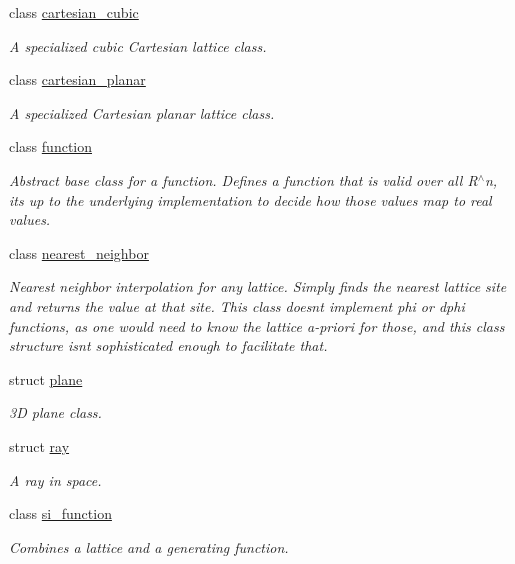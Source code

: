 \begin{DoxyCompactItemize}
class \hyperlink{classsisl_1_1cartesian__cubic}{cartesian\+\_\+cubic}
\begin{DoxyCompactList}\small\item\em A specialized cubic Cartesian lattice class. \end{DoxyCompactList}\item 
class \hyperlink{classsisl_1_1cartesian__planar}{cartesian\+\_\+planar}
\begin{DoxyCompactList}\small\item\em A specialized Cartesian planar lattice class. \end{DoxyCompactList}\item 
class \hyperlink{classsisl_1_1function}{function}
\begin{DoxyCompactList}\small\item\em Abstract base class for a function. Defines a function that is valid over all R$^\wedge$n, it\textquotesingle{}s up to the underlying implementation to decide how those values map to real values. \end{DoxyCompactList}\item 
class \hyperlink{classsisl_1_1nearest__neighbor}{nearest\+\_\+neighbor}
\begin{DoxyCompactList}\small\item\em Nearest neighbor interpolation for any lattice. Simply finds the nearest lattice site and returns the value at that site. This class doesn\textquotesingle{}t implement phi or dphi functions, as one would need to know the lattice a-\/priori for those, and this class structure isn\textquotesingle{}t sophisticated enough to facilitate that. \end{DoxyCompactList}\item 
struct \hyperlink{structsisl_1_1plane}{plane}
\begin{DoxyCompactList}\small\item\em 3D plane class. \end{DoxyCompactList}\item 
struct \hyperlink{structsisl_1_1ray}{ray}
\begin{DoxyCompactList}\small\item\em A ray in space. \end{DoxyCompactList}\item 
class \hyperlink{classsisl_1_1si__function}{si\+\_\+function}
\begin{DoxyCompactList}\small\item\em Combines a lattice and a generating function. \end{DoxyCompactList}\item 

\end{DoxyCompactItemize}
